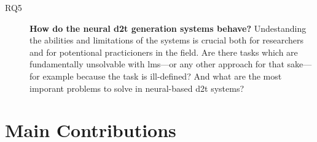 \begin{description}
    \item[RQ5] \textbf{How do the neural \ac{d2t} generation systems behave?} Undestanding the abilities and limitations of the systems is crucial both for researchers and for potentional practicioners in the field. Are there tasks which are fundamentally unsolvable with \acp{lm}---or any other approach for that sake---for example because the task is ill-defined? And what are the most imporant problems to solve in neural-based \ac{d2t} systems?
\end{description}



\section{Main Contributions}
\label{sec:contributions}


